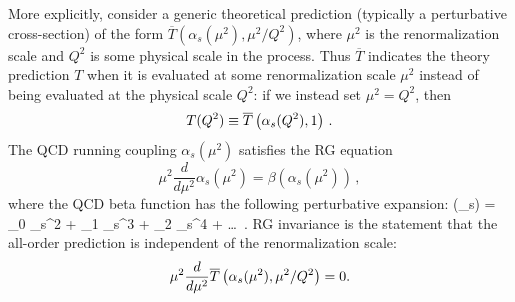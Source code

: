 More explicitly, consider
a generic theoretical prediction (typically a perturbative
cross-section) of the form $\overline{T}(\alpha_s(\mu^2), \mu^2/Q^2)$,
where $\mu^2$ is the renormalization scale and $Q^2$ is some physical
scale in the process. Thus $\overline{T}$ indicates the theory prediction 
$T$ when it is evaluated at some renormalization scale $\mu^2$ instead
of being evaluated at the physical scale $Q^2$: if we instead set 
$\mu^2=Q^2$, then
\begin{equation}
\label{xseccent}
T(Q^2) \equiv \overline{T} \left( \alpha_s(Q^2), 1 \right) \, .
\end{equation} 
The QCD running coupling $\alpha_s(\mu^2)$ satisfies the RG
equation 
%
\begin{equation} \label{1.1}
	\mu^2 \frac{d}{d \mu^2} \alpha_s(\mu^2) = \beta(\alpha_s(\mu^2)) \, ,
\end{equation}
%
where the QCD beta function 
has the following perturbative expansion:
\be
\label{eq:betafunctionQCD}
\beta(\alpha_s) = \beta_0 \alpha_s^2 + \beta_1 \alpha_s^3 
+ \beta_2 \alpha_s^4 + \ldots \, .
\ee 
RG invariance is the statement that
the all-order prediction is independent of the renormalization
scale: 
%
\begin{equation} \label{1.2}
  \mu^2 {{d}\over {d \mu^2}} \overline{T} \left(
  \alpha_s(\mu^2), \mu^2/Q^2\right)  = 0 .
\end{equation}
%

